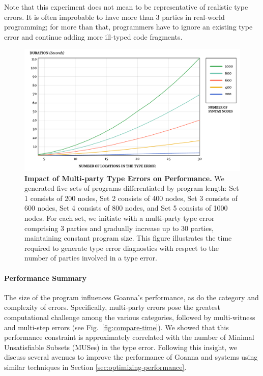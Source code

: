 \documentclass[pdflatex,lineno,sn-nature,Numbered]{sn-jnl}%
\begin{document}
Note that this experiment does not mean to be representative of realistic type errors. It is often improbable to have more than 3 parties in real-world programming; for more than that, programmers have to ignore an existing type error and continue adding more ill-typed code fragments.


\begin{figure}[ht]
    \centering
    \includegraphics[width=\linewidth]{images/MultiPartyDuration}
    \caption{{\bf Impact of Multi-party Type Errors on Performance.} We generated five sets of programs differentiated by program length: Set 1 consists of 200 nodes, Set 2 consists of 400 nodes, Set 3 consists of 600 nodes, Set 4 consists of 800 nodes, and Set 5 consists of 1000 nodes. For each set, we initiate with a multi-party type error comprising 3 parties and gradually increase up to 30 parties, maintaining constant program size. This figure illustrates the time required to generate type error diagnostics with respect to the number of parties involved in a type error. }
    
    \label{fig:multi-party-time}
\end{figure}

\paragraph{Performance Summary}
The size of the program influences Goanna's performance, as do the category and complexity of errors. Specifically, multi-party errors pose the greatest computational challenge among the various categories, followed by multi-witness and multi-step errors (see Fig.~\ref{fig:compare-time}). We showed that this performance constraint is approximately correlated with the number of Minimal Unsatisfiable Subsets (MUSes) in the type error. Following this insight, we discuss several avenues to improve the performance of Goanna and systems using similar techniques in Section \ref{sec:optimizing-performance}.
\end{document}
